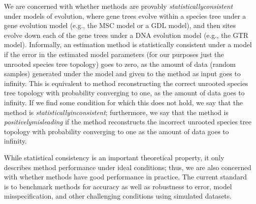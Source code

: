 We are concerned with whether methods are provably \textit{\gls{statisticallyconsistent}} under models of evolution, where gene trees evolve within a species tree under a gene evolution model (e.g., the MSC model or a GDL model), and then sites evolve down each of the gene trees under a DNA evolution model (e.g., the GTR model).
Informally, an estimation method is statistically consistent under a model if the error in the estimated model parameters (for our purposes just the unrooted species tree topology) goes to zero, as the amount of data (random samples) generated under the model and given to the method as input goes to infinity.
This is equivalent to method reconstructing the correct unrooted species tree topology with probability converging to one, as the amount of data goes to infinity.
If we find some condition for which this does not hold, we say that the method is \textit{\gls{statisticallyinconsistent}}; furthermore, we say that the method is \textit{\gls{positivelymisleading}} if the method reconstructs the incorrect unrooted species tree topology with probability converging to one as the amount of data goes to infinity.

While statistical consistency is an important theoretical property, it only describes method performance under ideal conditions; thus, we are also concerned with whether methods have good performance in practice.
The current standard is to benchmark methods for accuracy as well as robustness to error, model misspecification, and other challenging conditions using simulated datasets.

